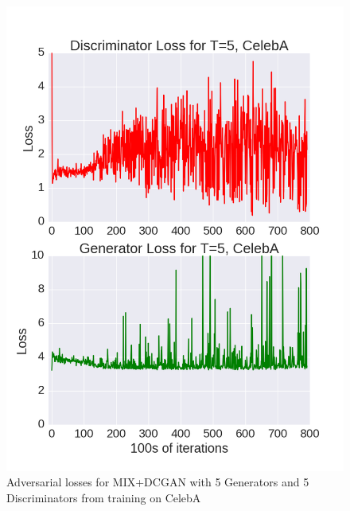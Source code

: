 \documentclass{article}
\begin{document}
\begin{figure}[!htb]%
  \centering
  \includegraphics[width=.85\linewidth]{figures/Loss_Graph_CelebA_T=5.png}
  \caption{Adversarial losses for MIX+DCGAN with 5 Generators and 5 Discriminators from training on CelebA}
  \label{fig2}
\end{figure}
\end{document}
